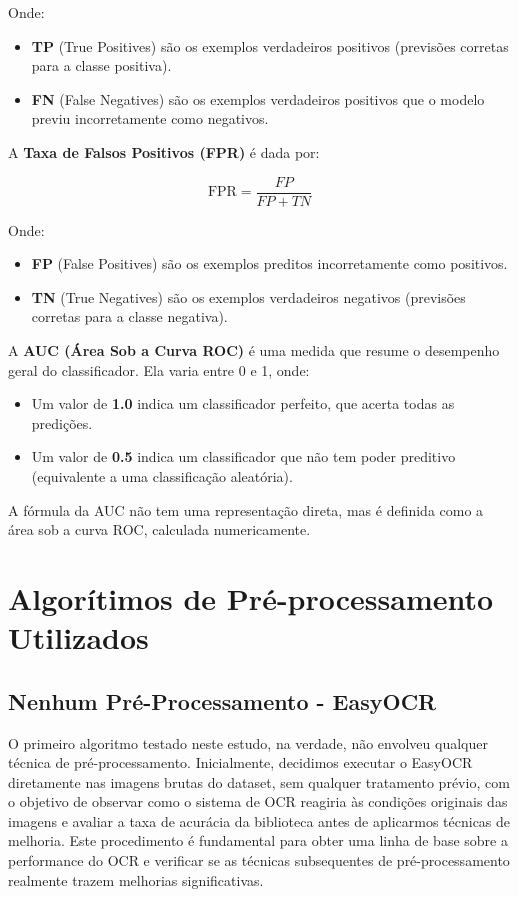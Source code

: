 \documentclass[conference]{IEEEtran}
\begin{document}
Onde:

\begin{itemize}
	\item \textbf{TP} (True Positives) são os exemplos verdadeiros positivos (previsões corretas para a classe positiva).
	\item \textbf{FN} (False Negatives) são os exemplos verdadeiros positivos que o modelo previu incorretamente como negativos.
\end{itemize}

A \textbf{Taxa de Falsos Positivos (FPR)} é dada por:

\[
\text{FPR} = \frac{FP}{FP + TN}
\]

Onde:

\begin{itemize}
	\item \textbf{FP} (False Positives) são os exemplos preditos incorretamente como positivos.
	\item \textbf{TN} (True Negatives) são os exemplos verdadeiros negativos (previsões corretas para a classe negativa).
\end{itemize}

A \textbf{AUC (Área Sob a Curva ROC)} é uma medida que resume o desempenho geral do classificador. Ela varia entre 0 e 1, onde:

\begin{itemize}
	\item Um valor de \textbf{1.0} indica um classificador perfeito, que acerta todas as predições.
	\item Um valor de \textbf{0.5} indica um classificador que não tem poder preditivo (equivalente a uma classificação aleatória).
\end{itemize}

A fórmula da AUC não tem uma representação direta, mas é definida como a área sob a curva ROC, calculada numericamente.


\section{Algorítimos de Pré-processamento Utilizados}


\subsection{Nenhum Pré-Processamento - EasyOCR}

O primeiro algoritmo testado neste estudo, na verdade, não envolveu qualquer técnica de pré-processamento. Inicialmente, decidimos executar o EasyOCR diretamente nas imagens brutas do dataset, sem qualquer tratamento prévio, com o objetivo de observar como o sistema de OCR reagiria às condições originais das imagens e avaliar a taxa de acurácia da biblioteca antes de aplicarmos técnicas de melhoria. Este procedimento é fundamental para obter uma linha de base sobre a performance do OCR e verificar se as técnicas subsequentes de pré-processamento realmente trazem melhorias significativas.
\end{document}
